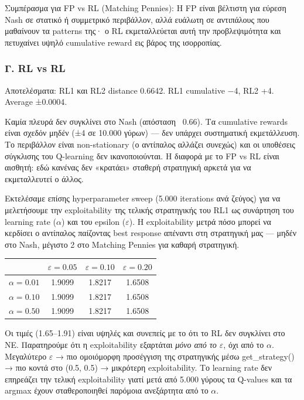 \documentclass[11pt,a4paper]{article}
\newcommand{\eng}[1]{\foreignlanguage{english}{#1}}
\begin{document}
Συμπέρασμα για FP vs RL (Matching Pennies): Η FP είναι βέλτιστη για εύρεση Nash σε στατικό ή συμμετρικό περιβάλλον, αλλά ευάλωτη σε αντιπάλους που μαθαίνουν τα patterns της· ο RL εκμεταλλεύεται αυτή την προβλεψιμότητα και πετυχαίνει υψηλό cumulative reward εις βάρος της ισορροπίας.

\subsubsection{Γ. RL vs RL}

Αποτελέσματα: RL1 και RL2 distance 0.6642. RL1 cumulative −4, RL2 +4. Average ±0.0004.

Καμία πλευρά δεν συγκλίνει στο Nash (απόσταση ~0.66). Τα cumulative rewards είναι σχεδόν μηδέν (±4 σε 10.000 γύρων) — δεν υπάρχει συστηματική εκμετάλλευση. Το περιβάλλον είναι non-stationary (ο αντίπαλος αλλάζει συνεχώς) και οι υποθέσεις σύγκλισης του Q-learning δεν ικανοποιούνται. Η διαφορά με το FP vs RL είναι αισθητή: εδώ κανένας δεν «κρατάει» σταθερή στρατηγική αρκετά για να εκμεταλλευτεί ο άλλος.

Εκτελέσαμε επίσης hyperparameter sweep (5.000 iterations ανά ζεύγος) για να μελετήσουμε την exploitability της τελικής στρατηγικής του RL1 ως συνάρτηση του learning rate (\(\alpha\)) και του epsilon (\(\varepsilon\)). Η exploitability μετρά πόσο μπορεί να κερδίσει ο αντίπαλος παίζοντας best response απέναντι στη στρατηγική μας — μηδέν στο Nash, μέγιστο 2 στο Matching Pennies για καθαρή στρατηγική.

\begin{center}
\small
\begin{tabular}{@{}lccc@{}}
\toprule
 & \(\varepsilon=0.05\) & \(\varepsilon=0.10\) & \(\varepsilon=0.20\) \\
\midrule
\(\alpha=0.01\) & 1.9099 & 1.8217 & 1.6508 \\
\(\alpha=0.10\) & 1.9099 & 1.8217 & 1.6508 \\
\(\alpha=0.50\) & 1.9099 & 1.8217 & 1.6508 \\
\bottomrule
\end{tabular}
\end{center}

Οι τιμές (1.65--1.91) είναι υψηλές και συνεπείς με το ότι το RL δεν συγκλίνει στο NE. Παρατηρούμε ότι η exploitability εξαρτάται \emph{μόνο από το \(\varepsilon\)}, όχι από το \(\alpha\). Μεγαλύτερο \(\varepsilon\) → πιο ομοιόμορφη προσέγγιση της στρατηγικής μέσω \eng{get\_strategy()} → πιο κοντά στο (0.5, 0.5) → μικρότερη exploitability. Το learning rate δεν επηρεάζει την τελική exploitability γιατί μετά από 5.000 γύρους τα Q-values και τα argmax έχουν σταθεροποιηθεί παρόμοια ανεξάρτητα από το \(\alpha\).
\end{document}

